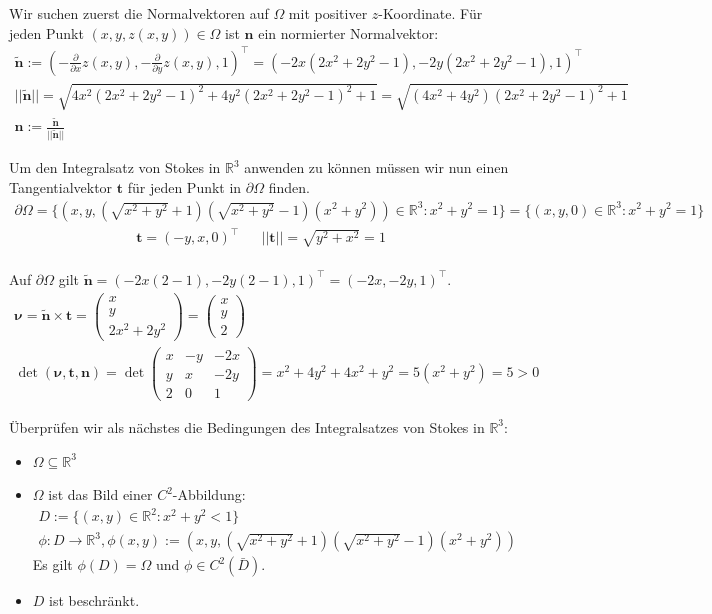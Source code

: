 \documentclass[]{article}
\begin{document}
Wir suchen zuerst die Normalvektoren auf $\Omega$ mit positiver $z$-Koordinate. Für jeden Punkt $(x,y,z(x,y)) \in \Omega$ ist $\bm{n}$ ein normierter Normalvektor:
\begin{align*}
	\tilde{\bm{n}} := \left(-\frac{\partial}{\partial x} z(x,y), -\frac{\partial}{\partial y} z(x,y), 1\right)^\top = (-2x(2x^2+2y^2-1), -2y(2x^2+2y^2-1), 1)^\top\\
	||\tilde{\bm{n}}|| = \sqrt{4x^2(2x^2+2y^2-1)^2 + 4y^2(2x^2+2y^2-1)^2 + 1} = \sqrt{(4x^2+4y^2)(2x^2+2y^2-1)^2+1}\\
	\bm{n}:= \frac{\tilde{\bm{n}}}{||\tilde{\bm{n}}||}
\end{align*}

Um den Integralsatz von Stokes in $\mathbb{R}^3$ anwenden zu können müssen wir nun einen Tangentialvektor $\bm{t}$ für jeden Punkt in $\partial\Omega$ finden.
\begin{align*}
	\partial\Omega = \{(x,y,(\sqrt{x^2+y^2}+1)(\sqrt{x^2+y^2}-1)(x^2+y^2)) \in \mathbb{R}^3: x^2+y^2=1\} = \{(x,y,0) \in \mathbb{R}^3: x^2+y^2=1\}
\end{align*}
\begin{align*}
	\bm{t} = (-y, x, 0)^\top && ||\bm{t}|| = \sqrt{y^2+x^2} = 1\\
\end{align*}

Auf $\partial\Omega$ gilt $\tilde{\bm{n}}=(-2x(2-1), -2y(2-1), 1)^\top = (-2x, -2y, 1)^\top$.
\begin{align*}
	\bm{\nu} = \tilde{\bm{n}} \times \bm{t} = \begin{pmatrix} x\\ y\\ 2x^2+2y^2 \end{pmatrix} = \begin{pmatrix} x\\ y\\ 2 \end{pmatrix}\\
	\det(\bm{\nu}, \bm{t}, \bm{n}) = \det\begin{pmatrix}
		x & -y & -2x\\
		y & x  & -2y\\
		2 & 0  & 1
	\end{pmatrix} = x^2+4y^2+4x^2+y^2 = 5(x^2+y^2) = 5 > 0
\end{align*}

Überprüfen wir als nächstes die Bedingungen des Integralsatzes von Stokes in $\mathbb{R}^3$:

\begin{itemize}
	\item $\Omega \subseteq \mathbb{R}^3$
	\item $\Omega$ ist das Bild einer $C^2$-Abbildung:
	\begin{align*}
		D := \{(x,y)\in\mathbb{R}^2: x^2+y^2 < 1\}\\
		\phi: D \rightarrow \mathbb{R}^3, \phi(x, y) := (x, y, (\sqrt{x^2+y^2}+1)(\sqrt{x^2+y^2}-1)(x^2+y^2))
	\end{align*}
	Es gilt $\phi(D)=\Omega$ und $\phi \in C^2(\bar{D})$.
	\item $D$ ist beschränkt.
\end{itemize}
\end{document}
